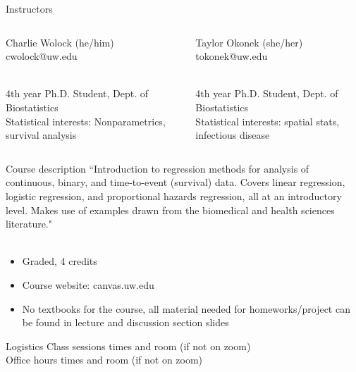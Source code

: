 \documentclass[10pt,t]{beamer}
\begin{document}
\begin{frame}{Instructors}
\begin{columns}
	\begin{column}[t]{0.4\textwidth}
            \small Charlie Wolock (he/him) \\ 
            cwolock@uw.edu \\~\
            
            \small 4th year Ph.D. Student, Dept. of Biostatistics \\
            \small Statistical interests: Nonparametrics, survival analysis
	\end{column}
	\begin{column}[t]{0.4\textwidth}  %
			\small Taylor Okonek (she/her) \\
			tokonek@uw.edu  \\~\ 
			
			\small 4th year Ph.D. Student, Dept. of Biostatistics \\
			\small Statistical interests: spatial stats, infectious disease
	\end{column}
\end{columns}

\end{frame}

\begin{frame}{Course description}
``Introduction to regression methods for analysis of continuous, binary, and time-to-event (survival) data. Covers linear regression, logistic regression, and proportional hazards regression, all at an introductory level. Makes use of examples drawn from the biomedical and health sciences literature." \\~\

\begin{itemize}
	\item Graded, 4 credits
	\item Course website: canvas.uw.edu
	\item No textbooks for the course, all material needed for homeworks/project can be found in lecture and discussion section slides
\end{itemize}

\end{frame}

\begin{frame}{Logistics}
Class sessions times and room (if not on zoom) \\
Office hours times and room (if not on zoom)
\end{frame}
\end{document}

